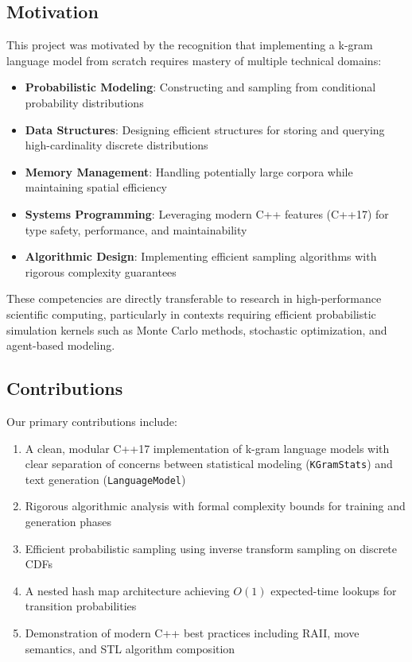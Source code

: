\documentclass[11pt,letterpaper]{article}
\begin{document}
\subsection{Motivation}

This project was motivated by the recognition that implementing a k-gram language model from scratch requires mastery of multiple technical domains:

\begin{itemize}
    \item \textbf{Probabilistic Modeling}: Constructing and sampling from conditional probability distributions
    \item \textbf{Data Structures}: Designing efficient structures for storing and querying high-cardinality discrete distributions
    \item \textbf{Memory Management}: Handling potentially large corpora while maintaining spatial efficiency
    \item \textbf{Systems Programming}: Leveraging modern C++ features (C++17) for type safety, performance, and maintainability
    \item \textbf{Algorithmic Design}: Implementing efficient sampling algorithms with rigorous complexity guarantees
\end{itemize}

These competencies are directly transferable to research in high-performance scientific computing, particularly in contexts requiring efficient probabilistic simulation kernels such as Monte Carlo methods, stochastic optimization, and agent-based modeling.

\subsection{Contributions}

Our primary contributions include:

\begin{enumerate}
    \item A clean, modular C++17 implementation of k-gram language models with clear separation of concerns between statistical modeling (\texttt{KGramStats}) and text generation (\texttt{LanguageModel})
    \item Rigorous algorithmic analysis with formal complexity bounds for training and generation phases
    \item Efficient probabilistic sampling using inverse transform sampling on discrete CDFs
    \item A nested hash map architecture achieving $O(1)$ expected-time lookups for transition probabilities
    \item Demonstration of modern C++ best practices including RAII, move semantics, and STL algorithm composition
\end{enumerate}
\end{document}
